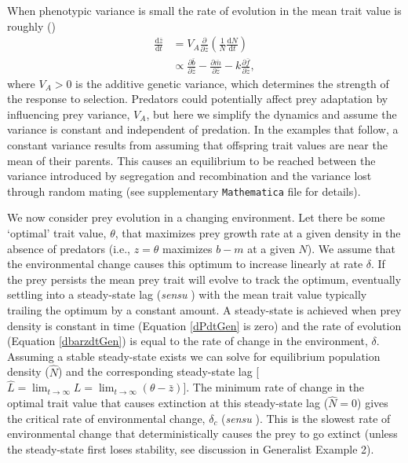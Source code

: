 \documentclass[11pt]{article}
\begin{document}
When phenotypic variance is small the rate of evolution in the mean trait value is roughly (\citealt{Lande1976}) 
\begin{equation}\label{dbarzdtGen}
\begin{aligned}
\frac{\mathrm{d}\bar{z}}{\mathrm{d}t} &= V_A \frac{\partial}{\partial\bar{z}} \left( \frac{1}{N} \frac{\mathrm{d}N}{\mathrm{d}t} \right)\\
&\propto \frac{\partial\bar{b}}{\partial\bar{z}} - \frac{\partial\bar{m}}{\partial\bar{z}} - k\frac{\partial\bar{f}}{\partial\bar{z}},
\end{aligned}
\end{equation}
where $V_A > 0$ is the additive genetic variance, which determines the strength of the response to selection.
Predators could potentially affect prey adaptation by influencing prey variance, $V_A$, but here we simplify the dynamics and assume the variance is constant and independent of predation.
In the examples that follow, a constant variance results from assuming that offspring trait values are near the mean of their parents.
This causes an equilibrium to be reached between the variance introduced by segregation and recombination and the variance lost through random mating (see supplementary \texttt{Mathematica} file for details). 

We now consider prey evolution in a changing environment.
Let there be some `optimal' trait value, $\theta$, that maximizes prey growth rate at a given density in the absence of predators (i.e., $z=\theta$ maximizes $b-m$ at a given $N$).
We assume that the environmental change causes this optimum to increase linearly at rate $\delta$. 
If the prey persists the mean prey trait will evolve to track the optimum, eventually settling into a steady-state lag (\textit{sensu} \citealt{Lynch1991}) with the mean trait value typically trailing the optimum by a constant amount.
A steady-state is achieved when prey density is constant in time (Equation \ref{dPdtGen} is zero) and the rate of evolution (Equation \ref{dbarzdtGen}) is equal to the rate of change in the environment, $\delta$.
Assuming a stable steady-state exists we can solve for equilibrium population density ($\hat{N}$) and the corresponding steady-state lag [$\hat{L} = \lim_{t\rightarrow\infty}L = \lim_{t\rightarrow\infty}(\theta - \bar{z})$].
The minimum rate of change in the optimal trait value that causes extinction at this steady-state lag ($\hat{N}=0$) gives the critical rate of environmental change, $\delta_c$ (\textit{sensu} \citealt{Lynch1991}).
This is the slowest rate of environmental change that deterministically causes the prey to go extinct (unless the steady-state first loses stability, see discussion in Generalist Example 2).
\end{document}
